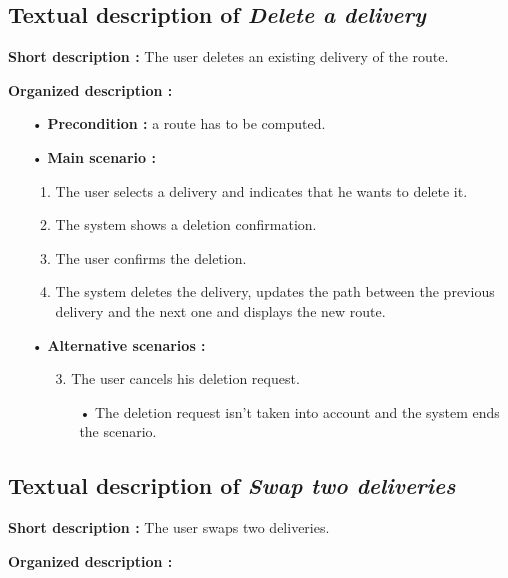 \documentclass[paper=a4, fontsize=11pt]{report}
\numberwithin{equation}{section}		%
\numberwithin{figure}{section}		%
\numberwithin{table}{section}		%
\renewcommand{\it}[1]{\textit{#1}}
\begin{document}
\subsection{Textual description of \it{Delete a delivery}}
\label{subsec:textual-description-of-delete-a-delivery}

\textbf{Short description :} The user deletes an existing delivery of the route.

\textbf{Organized description :}

\begin{itemize}
  \item[•] \textbf{Precondition :} a route has to be computed.
  \item[•] \textbf{Main scenario :}
  \begin{enumerate}
    \item The user selects a delivery and indicates that he wants to delete it.
    \item The system shows a deletion confirmation.
    \item The user confirms the deletion.
    \item The system deletes the delivery, updates the path between the previous delivery and the next one and displays the new route.
  \end{enumerate}
  \item[•] \textbf{Alternative scenarios :}
  \begin{itemize}
    \item[3.] The user cancels his deletion request.
    \begin{itemize}
      \item[•] The deletion request isn’t taken into account and the system ends the scenario.
    \end{itemize}
  \end{itemize}
\end{itemize}

\subsection{Textual description of \it{Swap two deliveries}}
\label{subsec:textual-description-of-swap-two-deliveries}

\textbf{Short description :} The user swaps two deliveries.

\textbf{Organized description :}
\end{document}
